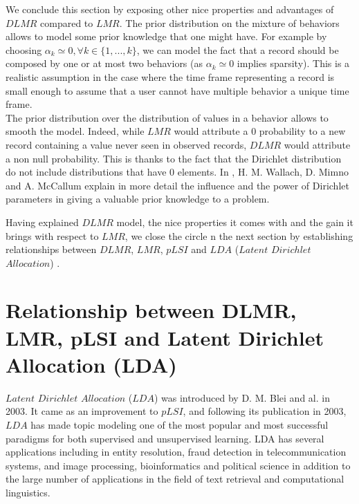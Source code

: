 We conclude this section by exposing other nice properties and advantages of $DLMR$ compared to $LMR$. The prior distribution on the mixture of behaviors allows to model some prior knowledge that one might have. For example by choosing $\alpha _{k}\simeq 0, \forall k\in \{1,...,k\}$, we can model the fact that a record should be composed by one or at most two behaviors (as $\alpha _{k}\simeq 0$ implies sparsity). This is a realistic assumption in the case where the time frame representing a record is small enough to assume that a user cannot have multiple behavior a unique time frame.
\\The prior distribution over the distribution of values in a behavior allows to smooth the model. Indeed, while $LMR$ would attribute a $0$ probability to a new record containing a value never seen in observed records, $DLMR$ would attribute a non null probability. This is thanks to the fact that the Dirichlet distribution do not include distributions that have $0$ elements. In \cite{dirinf}, H. M. Wallach, D. Mimno and A. McCallum explain in more detail the influence and the power of Dirichlet parameters in giving a valuable prior knowledge to a problem.\par

Having explained $DLMR$ model, the nice properties it comes with and the gain it brings with respect to $LMR$, we close the circle n the next section by establishing relationships between $DLMR$, $LMR$, $pLSI$ and $LDA$ ($Latent$ $Dirichlet$ $Allocation$) \cite{lda}.

\section{Relationship between DLMR, LMR, pLSI and Latent Dirichlet Allocation (LDA)} \label{relationshipghcmmdt}
$Latent$ $Dirichlet$ $Allocation$ ($LDA$) was introduced by D. M. Blei and al. \cite{lda} in 2003. It came as an improvement to $pLSI$, and following its publication in 2003, $LDA$\cite{lda} has made topic modeling one of the most popular and most successful paradigms for both supervised and unsupervised learning. LDA has several applications including in entity resolution, fraud detection in telecommunication systems, and image processing, bioinformatics and political science in addition to the large number of applications in the field of text retrieval and computational linguistics. \par

